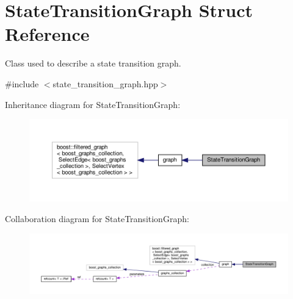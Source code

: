 \hypertarget{structStateTransitionGraph}{}\section{State\+Transition\+Graph Struct Reference}
\label{structStateTransitionGraph}


Class used to describe a state transition graph.  




{\ttfamily \#include $<$state\+\_\+transition\+\_\+graph.\+hpp$>$}



Inheritance diagram for State\+Transition\+Graph\+:
\nopagebreak
\begin{figure}[H]
\begin{center}
\leavevmode
\includegraphics[width=350pt]{dc/d45/structStateTransitionGraph__inherit__graph}
\end{center}
\end{figure}


Collaboration diagram for State\+Transition\+Graph\+:
\nopagebreak
\begin{figure}[H]
\begin{center}
\leavevmode
\includegraphics[width=350pt]{da/dbb/structStateTransitionGraph__coll__graph}
\end{center}
\end{figure}
